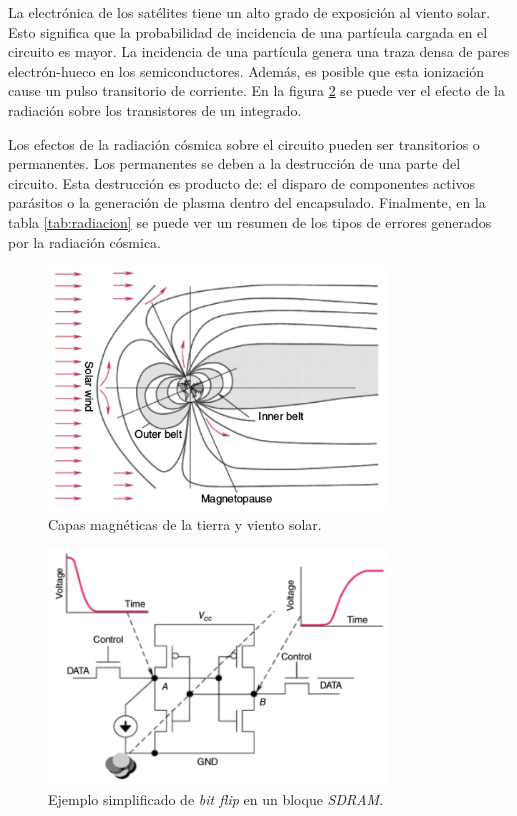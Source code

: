 La electrónica de los satélites tiene un alto grado de exposición al viento solar.
Esto significa que la probabilidad de incidencia de una partícula cargada en el circuito es mayor.
La incidencia de una partícula genera una traza densa de pares electrón-hueco en los semiconductores.
Además, es posible que esta ionización cause un pulso transitorio de corriente.
En la figura \ref{fig:bitflip} se puede ver el efecto de la radiación sobre los transistores de un integrado.

Los efectos de la radiación cósmica sobre el circuito pueden ser transitorios o permanentes.
Los permanentes se deben a la destrucción de una parte del circuito.
Esta destrucción es producto de: el disparo de componentes activos parásitos o la generación de plasma dentro del encapsulado.
Finalmente, en la tabla \ref{tab:radiacion} se puede ver un resumen de los tipos de errores generados por la radiación cósmica.

\newpage

\vfill
\begin{figure}[htbp]
	\centering
	\includegraphics[width=0.8\textwidth]{./Figures/vientosolar.jpg}
    \caption{Capas magnéticas de la tierra y viento solar\protect\footnotemark.}
	\label{fig:viento}
\end{figure}


\vfill

\begin{figure}[htbp]
	\centering
	\includegraphics[width=0.8\textwidth]{./Figures/bitflip.jpg}
    \caption{Ejemplo simplificado de \emph{bit flip} en un bloque \emph{SDRAM}\protect\footnotemark.}
	\label{fig:bitflip}
\end{figure}

